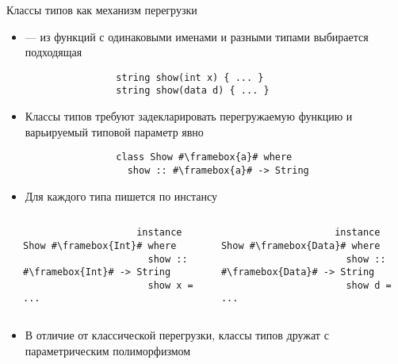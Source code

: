     \begin{frame}[fragile]{Классы типов как механизм перегрузки}
        \begin{itemize}
            \item {} --- из функций с одинаковыми именами и разными типами выбирается подходящая
            \begin{verbatim}
                string show(int x) { ... }
                string show(data d) { ... }
            \end{verbatim}
            \item Классы типов требуют задекларировать перегружаемую функцию и варьируемый типовой параметр явно
            \begin{verbatim}
                class Show #\framebox{a}# where
                  show :: #\framebox{a}# -> String
            \end{verbatim}
            \item Для каждого типа пишется по инстансу
        \end{itemize}
        \vspace{-1em}
        \begin{columns}[onlytextwidth]
            \begin{column}[t]{0.05\textwidth}
            \end{column}\hfill%
            \begin{column}[t]{0.485\textwidth}
                \begin{verbatim}
                    instance Show #\framebox{Int}# where
                      show :: #\framebox{Int}# -> String
                      show x = ...
                \end{verbatim}
            \end{column}\hfill%
            \begin{column}[t]{0.485\textwidth}
                \begin{verbatim}
                    instance Show #\framebox{Data}# where
                      show :: #\framebox{Data}# -> String
                      show d = ...
                \end{verbatim}
            \end{column}
        \end{columns}
        \vspace{0.5em}
        \begin{itemize}
            \item В отличие от классической перегрузки, классы типов дружат с параметрическим полиморфизмом
        \end{itemize}
    \end{frame}
    

